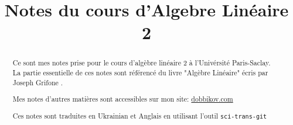 \documentclass[a4paper]{report}
\title{Notes du cours d'Algebre Linéaire 2}
\begin{document}
\maketitle
\begin{abstract}
    Ce sont mes notes prise pour le cours d'algèbre linéaire 2 à l'Univérsité Paris-Saclay. La partie essentielle de ces notes sont référencé du livre "Algèbre Linéaire" écris par Joseph Grifone \cite{grifone}.

   Mes notes d'autres matières sont accessibles sur mon site: \href{https://dobbikov.com/lecture_notes}{dobbikov.com}

  Ces notes sont traduites en Ukrainian et Anglais en utilisant l'outil \texttt{sci-trans-git} \cite{korotenko-sci-trans-git}
\end{abstract}
\tableofcontents











\nocite{*}
\printbibliography
\end{document}
